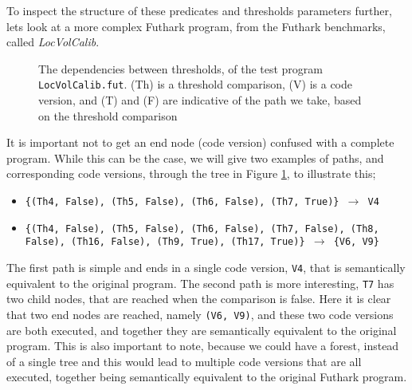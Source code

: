 To inspect the structure of these predicates and thresholds parameters further, 
lets look at a more complex Futhark program, from the Futhark benchmarks, 
called \textit{LocVolCalib}.
\begin{figure}
  \centering
  
  \caption{The dependencies between thresholds, of the test program 
  \texttt{LocVolCalib.fut}. (Th) is a threshold comparison, (V) is a code 
version, and (T) and (F) are indicative of the path we take, based on the 
threshold comparison}
  \label{LocVolCalibTree}
\end{figure}
\noindent It is important not to get an end node (code version) confused with a 
complete program. While this can be the case, we will give two examples of 
paths, and corresponding code versions, through the tree in Figure 
\ref{LocVolCalibTree}, to illustrate this;
\begin{itemize}
  \item \texttt{\{(Th4, False), (Th5, False), (Th6, False), (Th7, True)\} $\to$ 
    V4}
  \item \texttt{\{(Th4, False), (Th5, False), (Th6, False), (Th7, False), (Th8, 
    False), (Th16, False), (Th9, True), (Th17, True)\} $\to$ \{V6, V9\}}
\end{itemize} 

The first path is simple and ends in a single code version, \texttt{V4}, that 
is semantically equivalent to the original program. The second path is more 
interesting, \texttt{T7} has two child nodes, that are reached when the 
comparison is false. Here it is clear that two end nodes are reached, namely 
\texttt{(V6, V9)}, and these two code versions are both executed, and together they 
are semantically equivalent to the original program.  This is also important to 
note, because we could have a forest, instead of a single tree and this would 
lead to multiple code versions that are all executed, together being semantically 
equivalent to the original Futhark program. 
